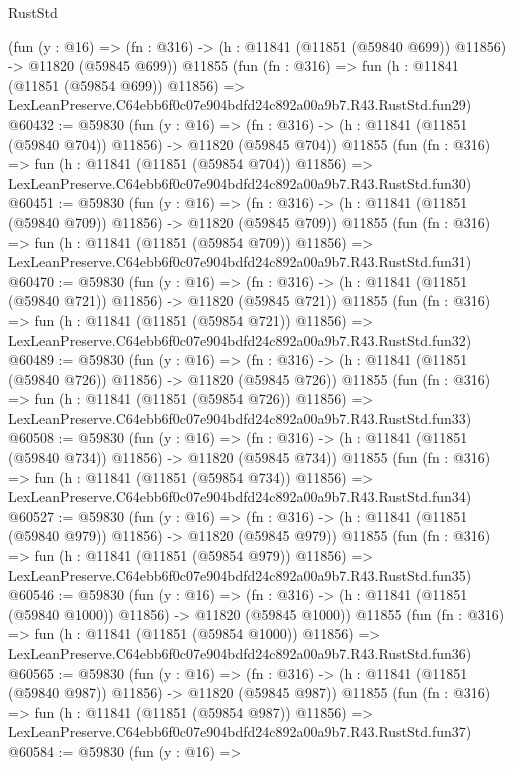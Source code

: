 \begin{lexlean}{RustStd}
\begin{coremodule}
    (fun (y : @16) =>
    (fn : @316) -> (h : @11841 (@11851 (@59840 @699)) @11856) -> @11820 (@59845 @699))
    @11855
    (fun (fn : @316) =>
    fun (h : @11841 (@11851 (@59854 @699)) @11856) =>
    LexLeanPreserve.C64ebb6f0c07e904bdfd24c892a00a9b7.R43.RustStd.fun29)
@60432 := @59830
    (fun (y : @16) =>
    (fn : @316) -> (h : @11841 (@11851 (@59840 @704)) @11856) -> @11820 (@59845 @704))
    @11855
    (fun (fn : @316) =>
    fun (h : @11841 (@11851 (@59854 @704)) @11856) =>
    LexLeanPreserve.C64ebb6f0c07e904bdfd24c892a00a9b7.R43.RustStd.fun30)
@60451 := @59830
    (fun (y : @16) =>
    (fn : @316) -> (h : @11841 (@11851 (@59840 @709)) @11856) -> @11820 (@59845 @709))
    @11855
    (fun (fn : @316) =>
    fun (h : @11841 (@11851 (@59854 @709)) @11856) =>
    LexLeanPreserve.C64ebb6f0c07e904bdfd24c892a00a9b7.R43.RustStd.fun31)
@60470 := @59830
    (fun (y : @16) =>
    (fn : @316) -> (h : @11841 (@11851 (@59840 @721)) @11856) -> @11820 (@59845 @721))
    @11855
    (fun (fn : @316) =>
    fun (h : @11841 (@11851 (@59854 @721)) @11856) =>
    LexLeanPreserve.C64ebb6f0c07e904bdfd24c892a00a9b7.R43.RustStd.fun32)
@60489 := @59830
    (fun (y : @16) =>
    (fn : @316) -> (h : @11841 (@11851 (@59840 @726)) @11856) -> @11820 (@59845 @726))
    @11855
    (fun (fn : @316) =>
    fun (h : @11841 (@11851 (@59854 @726)) @11856) =>
    LexLeanPreserve.C64ebb6f0c07e904bdfd24c892a00a9b7.R43.RustStd.fun33)
@60508 := @59830
    (fun (y : @16) =>
    (fn : @316) -> (h : @11841 (@11851 (@59840 @734)) @11856) -> @11820 (@59845 @734))
    @11855
    (fun (fn : @316) =>
    fun (h : @11841 (@11851 (@59854 @734)) @11856) =>
    LexLeanPreserve.C64ebb6f0c07e904bdfd24c892a00a9b7.R43.RustStd.fun34)
@60527 := @59830
    (fun (y : @16) =>
    (fn : @316) -> (h : @11841 (@11851 (@59840 @979)) @11856) -> @11820 (@59845 @979))
    @11855
    (fun (fn : @316) =>
    fun (h : @11841 (@11851 (@59854 @979)) @11856) =>
    LexLeanPreserve.C64ebb6f0c07e904bdfd24c892a00a9b7.R43.RustStd.fun35)
@60546 := @59830
    (fun (y : @16) =>
    (fn : @316) -> (h : @11841 (@11851 (@59840 @1000)) @11856) -> @11820 (@59845 @1000))
    @11855
    (fun (fn : @316) =>
    fun (h : @11841 (@11851 (@59854 @1000)) @11856) =>
    LexLeanPreserve.C64ebb6f0c07e904bdfd24c892a00a9b7.R43.RustStd.fun36)
@60565 := @59830
    (fun (y : @16) =>
    (fn : @316) -> (h : @11841 (@11851 (@59840 @987)) @11856) -> @11820 (@59845 @987))
    @11855
    (fun (fn : @316) =>
    fun (h : @11841 (@11851 (@59854 @987)) @11856) =>
    LexLeanPreserve.C64ebb6f0c07e904bdfd24c892a00a9b7.R43.RustStd.fun37)
@60584 := @59830
    (fun (y : @16) =>

\end{coremodule}
\end{lexlean}
